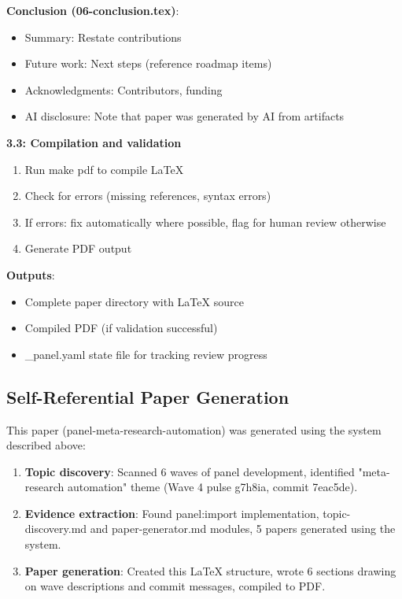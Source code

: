 \textbf{Conclusion (06-conclusion.tex)}:
\begin{itemize}
\item Summary: Restate contributions
\item Future work: Next steps (reference roadmap items)
\item Acknowledgments: Contributors, funding
\item AI disclosure: Note that paper was generated by AI from artifacts
\end{itemize}

\textbf{3.3: Compilation and validation}
\begin{enumerate}
\item Run make pdf to compile LaTeX
\item Check for errors (missing references, syntax errors)
\item If errors: fix automatically where possible, flag for human review otherwise
\item Generate PDF output
\end{enumerate}

\textbf{Outputs}:
\begin{itemize}
\item Complete paper directory with LaTeX source
\item Compiled PDF (if validation successful)
\item \_panel.yaml state file for tracking review progress
\end{itemize}

\subsection{Self-Referential Paper Generation}

This paper (panel-meta-research-automation) was generated using the system described above:

\begin{enumerate}
\item \textbf{Topic discovery}: Scanned 6 waves of panel development, identified "meta-research automation" theme (Wave 4 pulse g7h8ia, commit 7eac5de).

\item \textbf{Evidence extraction}: Found panel:import implementation, topic-discovery.md and paper-generator.md modules, 5 papers generated using the system.

\item \textbf{Paper generation}: Created this LaTeX structure, wrote 6 sections drawing on wave descriptions and commit messages, compiled to PDF.
\end{enumerate}

